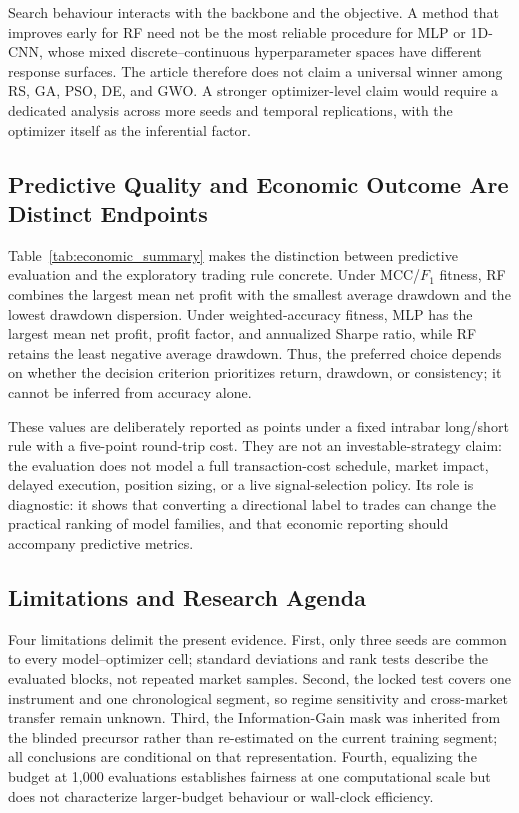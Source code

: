 Search behaviour interacts with the backbone and the objective. A method that improves early for RF need not be the most reliable procedure for MLP or 1D-CNN, whose mixed discrete--continuous hyperparameter spaces have different response surfaces. The article therefore does not claim a universal winner among RS, GA, PSO, DE, and GWO. A stronger optimizer-level claim would require a dedicated analysis across more seeds and temporal replications, with the optimizer itself as the inferential factor.

\subsection{Predictive Quality and Economic Outcome Are Distinct Endpoints}

Table~\ref{tab:economic_summary} makes the distinction between predictive evaluation and the exploratory trading rule concrete. Under MCC/$F_1$ fitness, RF combines the largest mean net profit with the smallest average drawdown and the lowest drawdown dispersion. Under weighted-accuracy fitness, MLP has the largest mean net profit, profit factor, and annualized Sharpe ratio, while RF retains the least negative average drawdown. Thus, the preferred choice depends on whether the decision criterion prioritizes return, drawdown, or consistency; it cannot be inferred from accuracy alone.

These values are deliberately reported as points under a fixed intrabar long/short rule with a five-point round-trip cost. They are not an investable-strategy claim: the evaluation does not model a full transaction-cost schedule, market impact, delayed execution, position sizing, or a live signal-selection policy. Its role is diagnostic: it shows that converting a directional label to trades can change the practical ranking of model families, and that economic reporting should accompany predictive metrics.

\subsection{Limitations and Research Agenda}

Four limitations delimit the present evidence. First, only three seeds are common to every model--optimizer cell; standard deviations and rank tests describe the evaluated blocks, not repeated market samples. Second, the locked test covers one instrument and one chronological segment, so regime sensitivity and cross-market transfer remain unknown. Third, the Information-Gain mask was inherited from the blinded precursor rather than re-estimated on the current training segment; all conclusions are conditional on that representation. Fourth, equalizing the budget at 1,000 evaluations establishes fairness at one computational scale but does not characterize larger-budget behaviour or wall-clock efficiency.

